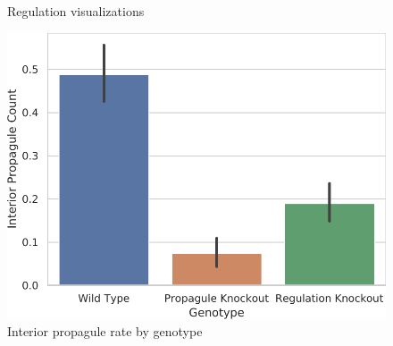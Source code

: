 \begin{figure}[!htbp]
\begin{center}
\begin{minipage}[t]{0.5\linewidth}
\begin{minipage}[b]{\linewidth}
\begin{center}
{ Regulation visualizations}

\end{center}
\end{minipage}

\begin{minipage}[t]{\linewidth}
\centering
\vspace{0pt} %
\begin{minipage}[b]{\linewidth}
\includegraphics[width=\linewidth]{img/knockout/interior_propagule/title=interior_propagules+_data_hathash_hash=bb0fa6254f1b7398+_script_fullcat_hash=f738b363bea8c98a+_source_hash=53a2252-clean+ext=}
{ Interior propagule rate by genotype}
\end{minipage}
\end{minipage}%
\hspace*{\fill}

\end{minipage}


\end{center}
\end{figure}
